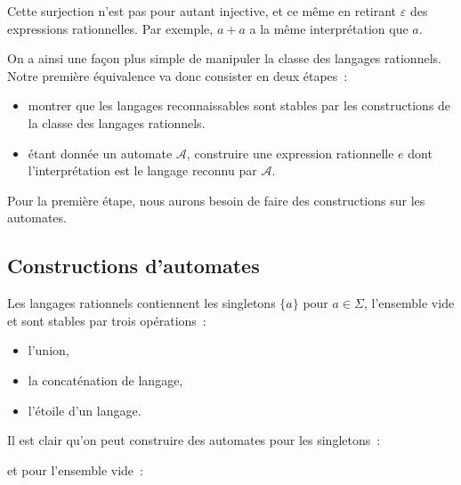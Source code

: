 \begin{remark}
  Cette surjection n'est pas pour autant injective, et ce même en retirant
  $\varepsilon$ des expressions rationnelles. Par exemple, $a + a$ a la même
  interprétation que $a$.
\end{remark}

On a ainsi une façon plus simple de manipuler la classe des langages rationnels.
Notre première équivalence va donc consister en deux étapes~:
\begin{itemize}
\item montrer que les langages reconnaissables sont stables par les
  constructions de la classe des langages rationnels.
\item étant donnée un automate $\mathcal A$, construire une expression
  rationnelle $e$ dont l'interprétation est le langage reconnu par $\mathcal A$.
\end{itemize}

Pour la première étape, nous aurons besoin de faire des constructions sur les
automates.

\subsection{Constructions d'automates}

Les langages rationnels contiennent les singletons $\{a\}$ pour $a \in \Sigma$,
l'ensemble vide et sont stables par trois opérations~:
\begin{itemize}
\item l'union,
\item la concaténation de langage,
\item l'étoile d'un langage.
\end{itemize}

Il est clair qu'on peut construire des automates pour les singletons~:
\begin{figure}[h]
  \centering
\end{figure}
et pour l'ensemble vide~:
\begin{figure}[h]
  \centering
\end{figure}

